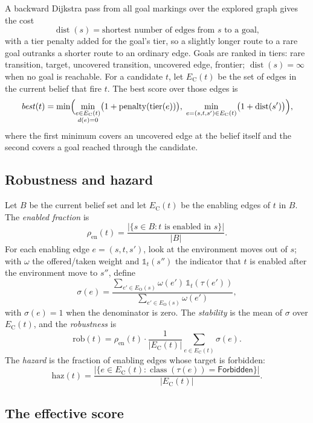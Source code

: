 \documentclass[11pt,a4paper]{article}
\newcommand{\cls}{\operatorname{class}}
\newcommand{\dist}{\operatorname{dist}}
\newcommand{\tierpen}{\operatorname{penalty}}
\begin{document}
A backward Dijkstra pass \cite{dijkstra1959note} from all goal markings over
the explored graph gives the cost
\[
  \dist(s)=\text{shortest number of edges from }s\text{ to a goal},
\]
with a tier penalty added for the goal's tier, so a slightly longer route to a
rare goal outranks a shorter route to an ordinary edge.  Goals are ranked in
tiers: rare transition, target, uncovered transition, uncovered edge,
frontier; $\dist(s)=\infty$ when no goal is reachable.  For a candidate $t$, let
$E_{\mathrm{C}}(t)$ be the set of edges in the current belief that fire $t$.
The best score over those edges is
\[
  \mathit{best}(t)=
  \min\Bigl(
    \min_{\substack{e\in E_{\mathrm{C}}(t)\\ d(e)=0}}
      \bigl(1+\tierpen(\operatorname{tier}(e))\bigr),\;
    \min_{e=(s,t,s')\in E_{\mathrm{C}}(t)}
      \bigl(1+\dist(s')\bigr)
  \Bigr),
\]
where the first minimum covers an uncovered edge at the belief itself and the
second covers a goal reached through the candidate.

\subsection{Robustness and hazard}

Let $B$ be the current belief set and let $E_{\mathrm{C}}(t)$ be the enabling
edges of $t$ in $B$.  The \emph{enabled fraction} is
\[
  \rho_{\mathrm{en}}(t)=\frac{|\{s\in B:t\text{ is enabled in }s\}|}{|B|}.
\]
For each enabling edge $e=(s,t,s')$, look at the environment moves out of
$s$; with $\omega$ the offered/taken weight and
$\mathbb{1}_{t}(s'')$ the indicator that $t$ is enabled after the environment
move to $s''$, define
\[
  \sigma(e)=
  \frac{\sum_{e'\in E_{\mathrm{O}}(s)}\omega(e')\,
        \mathbb{1}_{t}(\tau(e'))}
       {\sum_{e'\in E_{\mathrm{O}}(s)}\omega(e')},
\]
with $\sigma(e)=1$ when the denominator is zero.  The \emph{stability} is the
mean of $\sigma$ over $E_{\mathrm{C}}(t)$, and the \emph{robustness} is
\[
  \mathrm{rob}(t)=\rho_{\mathrm{en}}(t)\cdot
  \frac{1}{|E_{\mathrm{C}}(t)|}\sum_{e\in E_{\mathrm{C}}(t)}\sigma(e).
\]
The \emph{hazard} is the fraction of enabling edges whose target is
forbidden:
\[
  \mathrm{haz}(t)=
  \frac{|\{e\in E_{\mathrm{C}}(t):\cls(\tau(e))=\mathsf{Forbidden}\}|}
       {|E_{\mathrm{C}}(t)|}.
\]

\subsection{The effective score}
\end{document}
